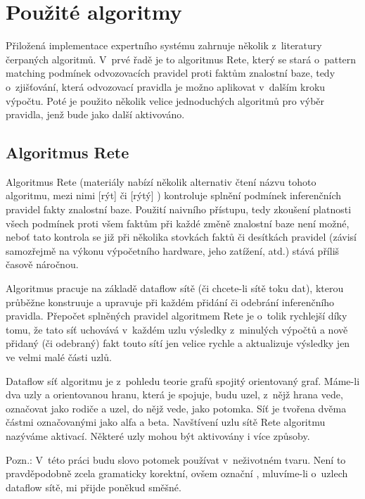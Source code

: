 \section{Použité algoritmy}
Přiložená implementace expertního systému zahrnuje několik z~literatury
čerpaných algoritmů. V~prvé řadě je to algoritmus Rete, který se stará o~pattern
matching podmínek odvozovacích pravidel proti faktům znalostní baze, tedy
o~zjišťování, která odvozovací pravidla je možno aplikovat v~dalším kroku výpočtu.
Poté je použito několik velice jednoduchých algoritmů pro výběr pravidla, jenž
bude jako další aktivováno.
\subsection{Algoritmus Rete}
Algoritmus Rete (materiály nabízí několik alternativ čtení názvu tohoto algoritmu,
mezi nimi  [rýt] či  [rýtý] \cite{doorenbos}) kontroluje
splnění podmínek inferenčních pravidel fakty znalostní baze. Použití naivního
přístupu, tedy zkoušení platnosti všech podmínek proti všem faktům při každé
změně znalostní baze není možné, neboť tato kontrola se již při několika stovkách
faktů či desítkách pravidel (závisí samozřejmě na výkonu výpočetního hardware, jeho
zatížení, atd.) stává příliš časově náročnou.

Algoritmus pracuje na základě dataflow sítě (či chcete-li sítě toku dat),
kterou průběžne konstruuje a upravuje při každém přidání či odebrání
inferenčního pravidla. Přepočet splněných pravidel algoritmem Rete je o~tolik
rychlejší díky tomu, že tato síť uchovává v~každém uzlu výsledky z~minulých
výpočtů a nově přidaný (či odebraný) fakt touto sítí jen velice rychle
 a aktualizuje výsledky jen ve velmi malé části uzlů.

Dataflow síť algoritmu je z~pohledu teorie grafů spojitý orientovaný graf.
Máme-li dva uzly a orientovanou hranu, která je spojuje, budu uzel, z~nějž
hrana vede, označovat jako rodiče a uzel, do nějž vede, jako potomka.
Síť je tvořena dvěma částmi označovanými jako alfa a beta. Navštívení uzlu
sítě Rete algoritmu nazýváme aktivací. Některé uzly mohou být aktivovány
i více způsoby.

Pozn.: V~této práci budu slovo potomek používat v~neživotném tvaru. Není to
pravděpodobně zcela gramaticky korektní, ovšem označní ,
mluvíme-li o~uzlech dataflow sítě, mi přijde poněkud směšné.

